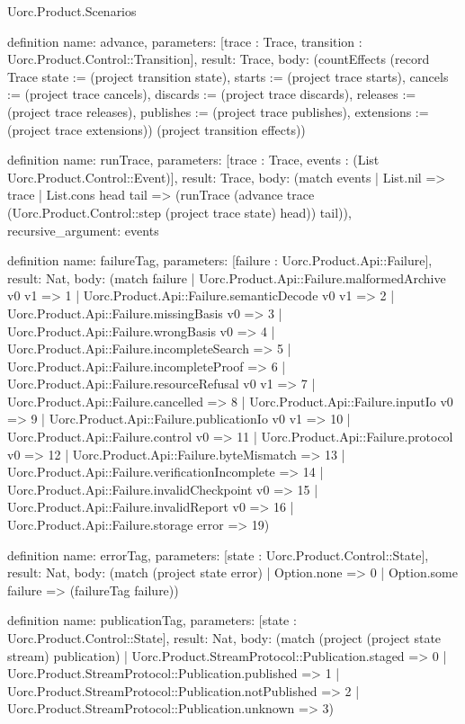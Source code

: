 \begin{lexlean}{Uorc.Product.Scenarios}
\begin{semanticmodule}
definition{
  name: advance,
  parameters: [trace : Trace, transition : Uorc.Product.Control::Transition],
  result: Trace,
  body: (countEffects (record Trace {state := (project transition state), starts := (project trace starts), cancels := (project trace cancels), discards := (project trace discards), releases := (project trace releases), publishes := (project trace publishes), extensions := (project trace extensions)}) (project transition effects))
}

definition{
  name: runTrace,
  parameters: [trace : Trace, events : (List Uorc.Product.Control::Event)],
  result: Trace,
  body: (match events
    | List.nil => trace
    | List.cons head tail => (runTrace (advance trace (Uorc.Product.Control::step (project trace state) head)) tail)),
  recursive_argument: events
}

definition{
  name: failureTag,
  parameters: [failure : Uorc.Product.Api::Failure],
  result: Nat,
  body: (match failure
    | Uorc.Product.Api::Failure.malformedArchive v0 v1 => 1
    | Uorc.Product.Api::Failure.semanticDecode v0 v1 => 2
    | Uorc.Product.Api::Failure.missingBasis v0 => 3
    | Uorc.Product.Api::Failure.wrongBasis v0 => 4
    | Uorc.Product.Api::Failure.incompleteSearch => 5
    | Uorc.Product.Api::Failure.incompleteProof => 6
    | Uorc.Product.Api::Failure.resourceRefusal v0 v1 => 7
    | Uorc.Product.Api::Failure.cancelled => 8
    | Uorc.Product.Api::Failure.inputIo v0 => 9
    | Uorc.Product.Api::Failure.publicationIo v0 v1 => 10
    | Uorc.Product.Api::Failure.control v0 => 11
    | Uorc.Product.Api::Failure.protocol v0 => 12
    | Uorc.Product.Api::Failure.byteMismatch => 13
    | Uorc.Product.Api::Failure.verificationIncomplete => 14
    | Uorc.Product.Api::Failure.invalidCheckpoint v0 => 15
    | Uorc.Product.Api::Failure.invalidReport v0 => 16
    | Uorc.Product.Api::Failure.storage error => 19)
}

definition{
  name: errorTag,
  parameters: [state : Uorc.Product.Control::State],
  result: Nat,
  body: (match (project state error)
    | Option.none => 0
    | Option.some failure => (failureTag failure))
}

definition{
  name: publicationTag,
  parameters: [state : Uorc.Product.Control::State],
  result: Nat,
  body: (match (project (project state stream) publication)
    | Uorc.Product.StreamProtocol::Publication.staged => 0
    | Uorc.Product.StreamProtocol::Publication.published => 1
    | Uorc.Product.StreamProtocol::Publication.notPublished => 2
    | Uorc.Product.StreamProtocol::Publication.unknown => 3)
}


\end{semanticmodule}
\end{lexlean}
